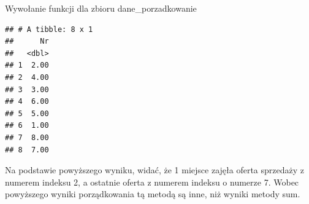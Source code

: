\documentclass[12pt,a4paper]{report}
\begin{document}
{Wywołanie funkcji dla zbioru dane\_porzadkowanie 

\begin{Shaded}
\begin{Highlighting}[]
\end{Highlighting}
\end{Shaded}

\begin{verbatim}
## # A tibble: 8 x 1
##      Nr
##   <dbl>
## 1  2.00
## 2  4.00
## 3  3.00
## 4  6.00
## 5  5.00
## 6  1.00
## 7  8.00
## 8  7.00
\end{verbatim}

Na podstawie powyższego wyniku, widać, że 1 miejsce zajęła oferta
sprzedaży z numerem indeksu 2, a ostatnie oferta z numerem indeksu o
numerze 7. Wobec powyższego wyniki porządkowania tą metodą są inne, niż wyniki metody sum. 
}
\end{document}
